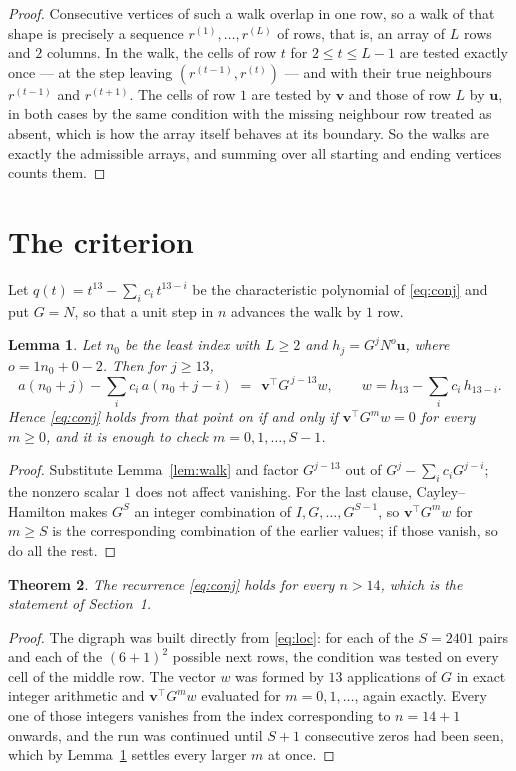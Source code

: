\documentclass[11pt,a4paper]{article}
\theoremstyle{plain}
\newtheorem{theorem}{Theorem}
\newtheorem{lemma}[theorem]{Lemma}
\theoremstyle{definition}
\begin{document}
\begin{proof}
Consecutive vertices of such a walk overlap in one row, so a walk of that shape is
precisely a sequence $r^{(1)},\dots,r^{(L)}$ of rows, that is, an array of $L$ rows
and $2$ columns. In the walk, the cells of row $t$ for $2\le t\le L-1$ are tested
exactly once --- at the step leaving $(r^{(t-1)},r^{(t)})$ --- and with their true
neighbours $r^{(t-1)}$ and $r^{(t+1)}$. The cells of row $1$ are tested by
$\mathbf{v}$ and those of row $L$ by $\mathbf{u}$, in both cases by the same condition
with the missing neighbour row treated as absent, which is how the array itself behaves at
its boundary. So the walks are exactly the admissible arrays, and summing over all starting
and ending vertices counts them.
\end{proof}

\section{The criterion}

Let $q(t)=t^{13}-\sum_i c_i\,t^{13-i}$ be the characteristic polynomial of
\eqref{eq:conj} and put $G=N$, so that a unit step in $n$ advances the walk by
$1$ row.

\begin{lemma}\label{lem:crit}
Let $n_0$ be the least index with $L\ge2$ and $h_j=G^{j}N^{o}\mathbf{u}$, where
$o=1n_0+0-2$. Then for $j\ge13$,
\[
a(n_0+j)-\sum_i c_i\,a(n_0+j-i)\;=\;\,\mathbf{v}^{\!\top}G^{\,j-13}w,
\qquad w=h_{13}-\sum_i c_i\,h_{13-i} .
\]
Hence \eqref{eq:conj} holds from that point on if and only if
$\mathbf{v}^{\!\top}G^{m}w=0$ for every $m\ge0$, and it is enough to check
$m=0,1,\dots,S-1$.
\end{lemma}

\begin{proof}
Substitute Lemma~\ref{lem:walk} and factor $G^{j-13}$ out of
$G^{j}-\sum_ic_iG^{j-i}$; the nonzero scalar $1$ does not affect
vanishing. For the last clause, Cayley--Hamilton makes $G^{S}$ an integer combination of
$I,G,\dots,G^{S-1}$, so $\mathbf{v}^{\!\top}G^{m}w$ for $m\ge S$ is the corresponding
combination of the earlier values; if those vanish, so do all the rest.
\end{proof}

\begin{theorem}
The recurrence \eqref{eq:conj} holds for every $n>14$, which is the statement of
Section~1.
\end{theorem}

\begin{proof}
The digraph was built directly from \eqref{eq:loc}: for each of the $S=2401$ pairs and each
of the $(6+1)^{2}$ possible next rows, the condition was tested on every cell of
the middle row. The vector $w$ was formed by $13$ applications of $G$ in exact integer
arithmetic and $\mathbf{v}^{\!\top}G^{m}w$ evaluated for $m=0,1,\dots$, again exactly.
Every one of those integers vanishes from the index corresponding to $n=14+1$ onwards,
and the run was continued until $S+1$ consecutive zeros had been seen, which by
Lemma~\ref{lem:crit} settles every larger $m$ at once.
\end{proof}
\end{document}
